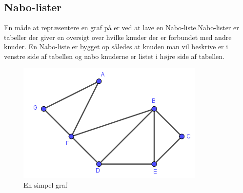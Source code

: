 \subsection{Nabo-lister}
En måde at repræsentere en graf på er ved at lave en Nabo-liste.Nabo-lister er tabeller der giver en oversigt over hvilke knuder der er forbundet med andre knuder. En Nabo-liste er bygget op således at knuden man vil beskrive er i venstre side af tabellen og nabo knuderne er listet i højre side af tabellen. 

\begin{exmp}
	\begin{figure}
	\centering
	\includegraphics[scale=0.5]{fig/img/Nabolisteeks1}
	\caption{En simpel graf}
	\end{figure}
\end{exmp}